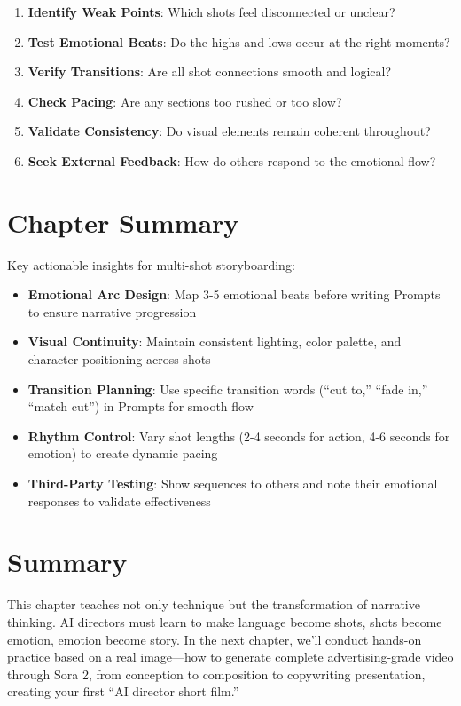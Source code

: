\begin{enumerate}
\item \textbf{Identify Weak Points}: Which shots feel disconnected or unclear?
\item \textbf{Test Emotional Beats}: Do the highs and lows occur at the right moments?
\item \textbf{Verify Transitions}: Are all shot connections smooth and logical?
\item \textbf{Check Pacing}: Are any sections too rushed or too slow?
\item \textbf{Validate Consistency}: Do visual elements remain coherent throughout?
\item \textbf{Seek External Feedback}: How do others respond to the emotional flow?
\end{enumerate}

\section*{Chapter Summary}

Key actionable insights for multi-shot storyboarding:

\begin{itemize}
\item \textbf{Emotional Arc Design}: Map 3-5 emotional beats before writing Prompts to ensure narrative progression
\item \textbf{Visual Continuity}: Maintain consistent lighting, color palette, and character positioning across shots
\item \textbf{Transition Planning}: Use specific transition words (``cut to,'' ``fade in,'' ``match cut'') in Prompts for smooth flow
\item \textbf{Rhythm Control}: Vary shot lengths (2-4 seconds for action, 4-6 seconds for emotion) to create dynamic pacing
\item \textbf{Third-Party Testing}: Show sequences to others and note their emotional responses to validate effectiveness
\end{itemize}

\section*{Summary}

This chapter teaches not only technique but the transformation of narrative thinking. AI directors must learn to make language become shots, shots become emotion, emotion become story. In the next chapter, we'll conduct hands-on practice based on a real image—how to generate complete advertising-grade video through Sora 2, from conception to composition to copywriting presentation, creating your first ``AI director short film.''
